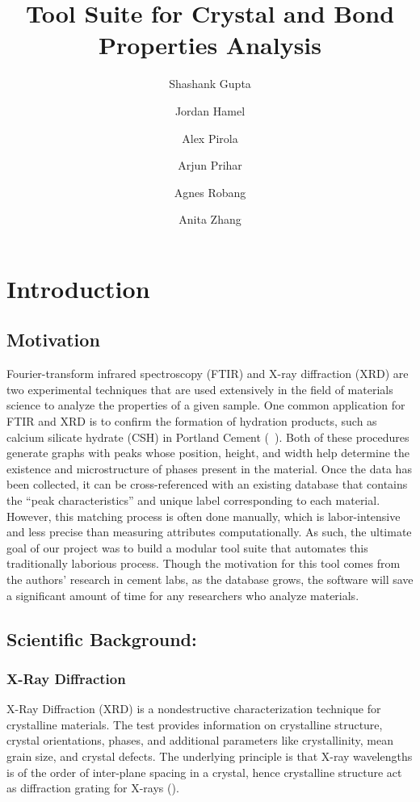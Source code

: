 \documentclass{dhbenelux}
\author{Shashank Gupta}
\author{Jordan Hamel}
\author{Alex Pirola}
\author{Arjun Prihar}
\author{Agnes Robang}
\author{Anita Zhang}
\affil{APC 524}
\affil{December 20th, 2021}
\title{Tool Suite for Crystal and Bond Properties Analysis }
\begin{document}
\maketitle
\thispagestyle{papertitlepage} 

\section{Introduction}

\subsection{Motivation}

Fourier-transform infrared spectroscopy (FTIR) and X-ray diffraction (XRD) are two experimental techniques that are used extensively in the field of materials science to analyze the properties of a given sample. One common application for FTIR and XRD is to confirm the formation of hydration products, such as calcium silicate hydrate (CSH) in Portland Cement (~\cite{shi2019ftir}). Both of these procedures generate graphs with peaks whose position, height, and width help determine the existence and microstructure of phases present in the material. Once the data has been collected, it can be cross-referenced with an existing database that contains the “peak characteristics” and unique label corresponding to each material. However, this matching process is often done manually, which is labor-intensive and less precise than measuring attributes computationally. As such, the ultimate goal of our project was to build a modular tool suite that automates this traditionally laborious process. Though the motivation for this tool comes from the authors' research in cement labs, as the database grows, the software will save a significant amount of time for any researchers who analyze materials.  


\subsection{Scientific Background:}

\subsubsection{X-Ray Diffraction}
\label{X-Ray Diffraction}

X-Ray Diffraction (XRD) is a nondestructive characterization technique for crystalline materials. The test provides information on crystalline structure, crystal orientations, phases, and additional parameters like crystallinity, mean grain size, and crystal defects. The underlying principle is that X-ray wavelengths is of the order of inter-plane spacing in a crystal, hence crystalline structure act as diffraction grating for X-rays (\cite{XRD1}).
\end{document}
